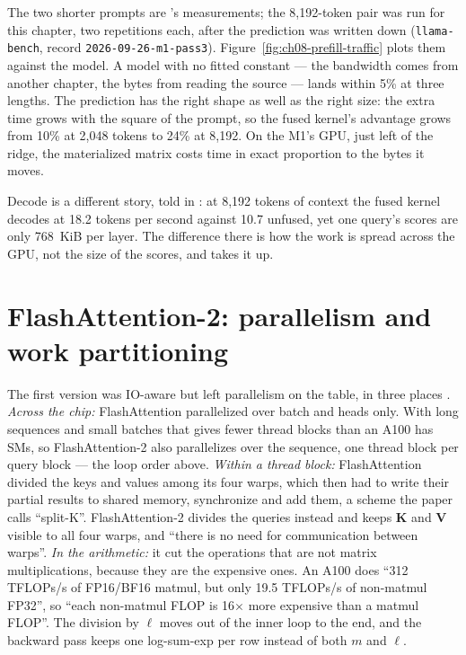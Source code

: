 \noindent The two shorter prompts are 's measurements;
the 8,192-token pair was run for this chapter, two repetitions each, after the
prediction was written down (\texttt{llama-bench}, record
\texttt{2026-09-26-m1-pass3}). Figure~\ref{fig:ch08-prefill-traffic} plots them
against the model. A model with no fitted constant --- the bandwidth comes from
another chapter, the bytes from reading the source --- lands within 5\% at
three lengths. The prediction has the right shape as well as the right size:
the extra time grows with the square of the prompt, so the fused kernel's
advantage grows from 10\% at 2,048 tokens to 24\% at 8,192. On the M1's GPU,
just left of the ridge, the materialized matrix costs time in exact proportion
to the bytes it moves.


Decode is a different story, told in : at 8,192 tokens of
context the fused kernel decodes at 18.2 tokens per second against 10.7
unfused, yet one query's scores are only 768~KiB per layer. The difference
there is how the work is spread across the GPU, not the size of the scores,
and  takes it up.

\section{FlashAttention-2: parallelism and work partitioning}

The first version was IO-aware but left parallelism on the table, in three
places \cite{dao2023flashattention2}. \emph{Across the chip:} FlashAttention
parallelized over batch and heads only. With long sequences and small batches
that gives fewer thread blocks than an A100 has SMs, so FlashAttention-2 also
parallelizes over the sequence, one thread block per query block --- the loop
order above. \emph{Within a thread block:} FlashAttention divided the keys and
values among its four warps, which then had to write their partial results to
shared memory, synchronize and add them, a scheme the paper calls ``split-K''.
FlashAttention-2 divides the queries instead and keeps $\mathbf{K}$ and
$\mathbf{V}$ visible to all four warps, and ``there is no need for
communication between warps''. \emph{In the arithmetic:} it cut the operations
that are not matrix multiplications, because they are the expensive ones. An
A100 does ``312 TFLOPs/s of FP16/BF16 matmul, but only 19.5 TFLOPs/s of
non-matmul FP32'', so ``each non-matmul FLOP is 16$\times$ more expensive than a
matmul FLOP''. The division by $\ell$ moves out of the inner loop to the end,
and the backward pass keeps one log-sum-exp per row instead of both $m$ and
$\ell$.

